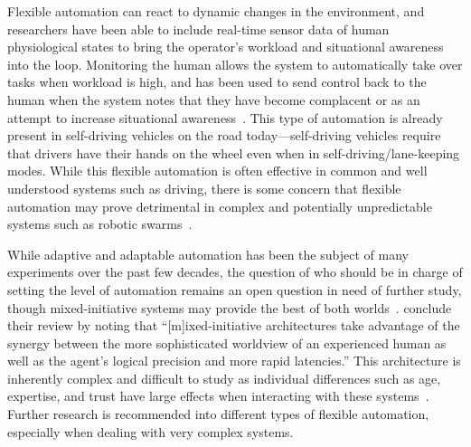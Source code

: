 Flexible automation can react to dynamic changes in the environment, and researchers have been able to include real-time sensor data of human physiological states to bring the operator's workload and situational awareness into the loop.
Monitoring the human allows the system to automatically take over tasks when workload is high, and has been used to send control back to the human when the system notes that they have become complacent or as an attempt to increase situational awareness~\citep{lu_human_2016}.
This type of automation is already present in self-driving vehicles on the road today—self-driving vehicles require that drivers have their hands on the wheel even when in self-driving/lane-keeping modes.
While this flexible automation is often effective in common and well understood systems such as driving, there is some concern that flexible automation may prove detrimental in complex and potentially unpredictable systems such as robotic swarms~\citep{kolling_human_2016}.

While adaptive and adaptable automation has been the subject of many experiments over the past few decades, the question of who should be in charge of setting the level of automation remains an open question in need of further study, though mixed-initiative systems may provide the best of both worlds~\citep{chen_humanagent_2014, parasuraman_humans:_2008}.
\citeauthor{chen_humanagent_2014} conclude their review by noting that ``[m]ixed-initiative architectures take advantage of the synergy between the more sophisticated worldview of an experienced human as well as the agent's logical precision and more rapid latencies.''
This architecture is inherently complex and difficult to study as individual differences such as age, expertise, and trust have large effects when interacting with these systems~\citep{schaefer_meta-analysis_2016}.
Further research is recommended into different types of flexible automation, especially when dealing with very complex systems.


